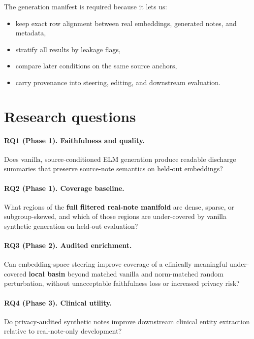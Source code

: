 \documentclass[11pt]{article}
\begin{document}
The generation manifest is required because it lets us:
\begin{itemize}[nosep]
  \item keep exact row alignment between real embeddings, generated notes, and metadata,
  \item stratify all results by leakage flags,
  \item compare later conditions on the same source anchors,
  \item carry provenance into steering, editing, and downstream evaluation.
\end{itemize}

\section{Research questions}

\paragraph{RQ1 (Phase 1). Faithfulness and quality.}
Does vanilla, source-conditioned ELM generation produce readable discharge summaries that preserve source-note semantics on held-out embeddings?

\paragraph{RQ2 (Phase 1). Coverage baseline.}
What regions of the \textbf{full filtered real-note manifold} are dense, sparse, or subgroup-skewed, and which of those regions are under-covered by vanilla synthetic generation on held-out evaluation?

\paragraph{RQ3 (Phase 2). Audited enrichment.}
Can embedding-space steering improve coverage of a clinically meaningful under-covered \textbf{local basin} beyond matched vanilla and norm-matched random perturbation, without unacceptable faithfulness loss or increased privacy risk?

\paragraph{RQ4 (Phase 3). Clinical utility.}
Do privacy-audited synthetic notes improve downstream clinical entity extraction relative to real-note-only development?
\end{document}
